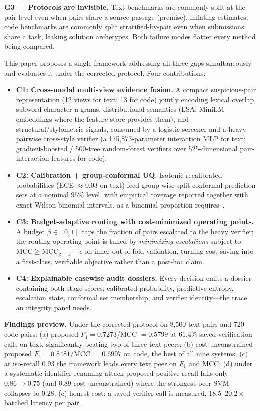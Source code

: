 \documentclass[conference]{IEEEtran}
\newcommand{\mcc}{\mathrm{MCC}}
\newcommand{\fone}{F_{1}}
\begin{document}
\textbf{G3 --- Protocols are invisible.} Text benchmarks are commonly split at the pair level even
when pairs share a source passage (premise), inflating estimates; code benchmarks are commonly
split stratified-by-pair even when submissions share a task, leaking solution archetypes. Both
failure modes flatter every method being compared.

This paper proposes a single framework addressing all three gaps simultaneously and evaluates it
under the corrected protocol. Four contributions:

\begin{itemize}[leftmargin=1.6em]
\item \textbf{C1: Cross-modal multi-view evidence fusion.} A compact suspicious-pair representation
  (12 views for text; 13 for code) jointly encoding lexical overlap, subword character n-grams,
  distributional semantics (LSA; MiniLM embeddings where the feature store provides them), and
  structural/stylometric signals, consumed by a logistic screener and a heavy pairwise
  cross-style verifier (a 175{,}873-parameter interaction MLP for text; gradient-boosted /
  500-tree random-forest verifiers over 525-dimensional pair-interaction features for code).
\item \textbf{C2: Calibration + group-conformal UQ.} Isotonic-recalibrated probabilities
  (ECE $\approx 0.03$ on text) feed group-wise split-conformal prediction sets at a nominal $95\%$
  level, with empirical coverage reported together with exact Wilson binomial intervals, as a binomial
  proportion requires~\cite{vovk2005,angelopoulos2021}.
\item \textbf{C3: Budget-adaptive routing with cost-minimized operating points.} A budget
  $\beta \in [0,1]$ caps the fraction of pairs escalated to the heavy verifier; the routing
  operating point is tuned by \emph{minimizing escalations} subject to
  $\mcc \geq \mcc_{\beta=1} - \epsilon$ on inner out-of-fold validation, turning cost saving into a
  first-class, verifiable objective rather than a post-hoc claim.
\item \textbf{C4: Explainable casewise audit dossiers.} Every decision emits a dossier containing
  both stage scores, calibrated probability, predictive entropy, escalation state, conformal set
  membership, and verifier identity---the trace an integrity panel needs.
\end{itemize}

\noindent\textbf{Findings preview.} Under the corrected protocol on 8{,}500 text pairs and 720
code pairs: (a) proposed $\fone=0.7273$/MCC $=0.5799$ at $61.4\%$ saved verification calls on text,
significantly beating two of three text peers; (b) cost-unconstrained proposed $\fone=0.8481$/MCC
$=0.6997$ on code, the best of all nine systems; (c) at iso-recall $0.93$ the framework leads every
text peer on $\fone$ and MCC; (d) under a systematic identifier-renaming attack proposed positive
recall falls only $0.86\rightarrow0.75$ (and $0.89$ cost-unconstrained) where the strongest
peer SVM collapses to $0.28$; (e) honest cost: a saved verifier call is measured,
$18.5$--$20.2\times$ batched latency per pair.
\end{document}
